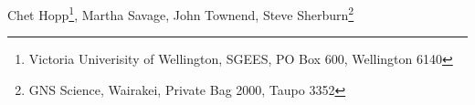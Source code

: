 Chet Hopp\footnote{\label{note1}Victoria Univerisity of Wellington, SGEES, PO Box 600, Wellington 6140}, Martha Savage\footnotemark[\ref{note1}], John Townend\footnotemark[\ref{note1}], Steve Sherburn\footnote{GNS Science, Wairakei, Private Bag 2000, Taupo 3352}